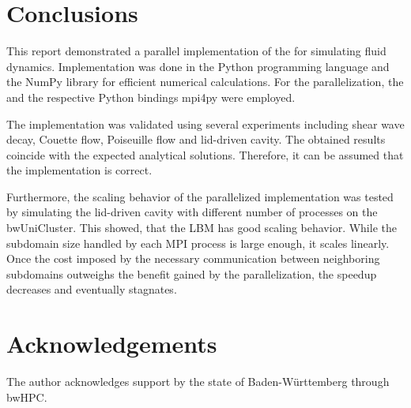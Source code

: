 \section{Conclusions}

This report demonstrated a parallel implementation of the  for simulating fluid dynamics. Implementation was done in the Python programming language and the NumPy library for efficient numerical calculations. For the parallelization, the  and the respective Python bindings mpi4py were employed.

The implementation was validated using several experiments including shear wave decay, Couette flow, Poiseuille flow and lid-driven cavity. The obtained results coincide with the expected analytical solutions. Therefore, it can be assumed that the implementation is correct.

Furthermore, the scaling behavior of the parallelized implementation was tested by simulating the lid-driven cavity with different number of processes on the bwUniCluster. This showed, that the \gls{LBM} has good scaling behavior. While the subdomain size handled by each MPI process is large enough, it scales linearly. Once the cost imposed by the necessary communication between neighboring subdomains outweighs the benefit gained by the parallelization, the speedup decreases and eventually stagnates.

\section*{Acknowledgements}

The author acknowledges support by the state of Baden-Württemberg through bwHPC.
